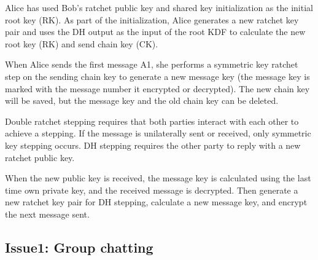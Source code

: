 \documentclass[11pt,en]{elegantpaper}
\begin{document}
Alice has used Bob's ratchet public key and shared key initialization as the initial root key (RK). As part of the initialization, Alice generates a new ratchet key pair and uses the DH output as the input of the root KDF to calculate the new root key (RK) and send chain key (CK).

When Alice sends the first message A1, she performs a symmetric key ratchet step on the sending chain key to generate a new message key (the message key is marked with the message number it encrypted or decrypted). The new chain key will be saved, but the message key and the old chain key can be deleted.

Double ratchet stepping requires that both parties interact with each other to achieve a stepping. If the message is unilaterally sent or received, only symmetric key stepping occurs. DH stepping requires the other party to reply with a new ratchet public key.

When the new public key is received, the message key is calculated using the last time own private key, and the received message is decrypted. Then generate a new ratchet key pair for DH stepping, calculate a new message key, and encrypt the next message sent.








\subsection{Issue1: Group chatting}
\end{document}
